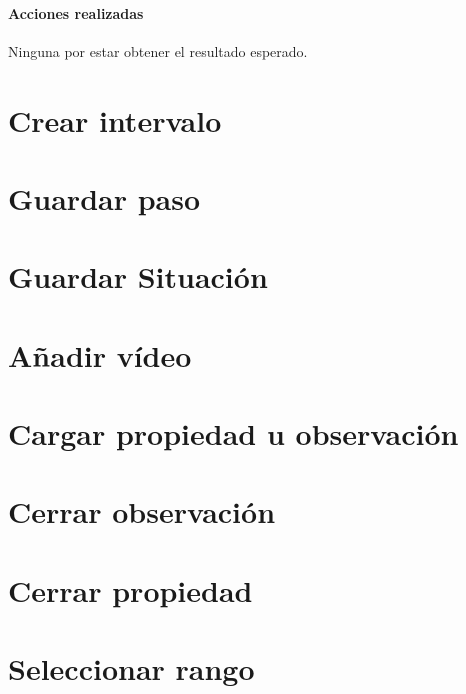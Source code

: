 \paragraph{Acciones realizadas}
Ninguna por estar obtener el resultado esperado.

\section{Crear intervalo}

\section{Guardar paso}

\section{Guardar Situaci\'on}

\section{A\~nadir v\'ideo}

\section{Cargar propiedad u observaci\'on}

\section{Cerrar observaci\'on}

\section{Cerrar propiedad}

\section{Seleccionar rango}